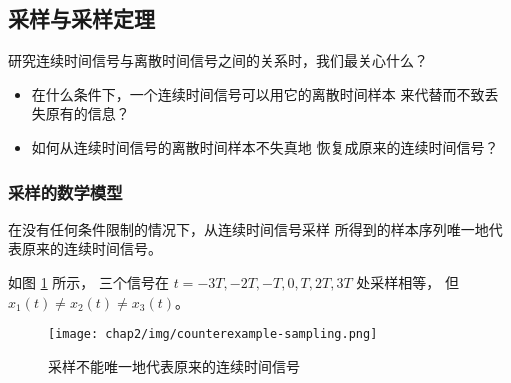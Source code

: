 \subsection{采样与采样定理}

研究连续时间信号与离散时间信号之间的关系时，我们最关心什么？
\begin{itemize}
    \item 在什么条件下，一个连续时间信号可以用它的离散时间样本
        来代替而不致丢失原有的信息？
    \item 如何从连续时间信号的离散时间样本不失真地
        恢复成原来的连续时间信号？
\end{itemize}

\subsubsection{采样的数学模型}

\begin{property}
    在没有任何条件限制的情况下，从连续时间信号采样
    所得到的样本序列唯一地代表原来的连续时间信号。
\end{property}

\begin{example}
    如图 \ref{fig:counterexample-sampling} 所示，
    三个信号在 $t = -3T, -2T, -T, 0, T, 2T, 3T$ 处采样相等，
    但 $x_1(t) \neq x_2(t) \neq x_3(t)$。
    \begin{figure}[H]
        \centering
        \texttt{[image: chap2/img/counterexample-sampling.png]}
        \caption{采样不能唯一地代表原来的连续时间信号}
        \label{fig:counterexample-sampling}
    \end{figure}
\end{example}

